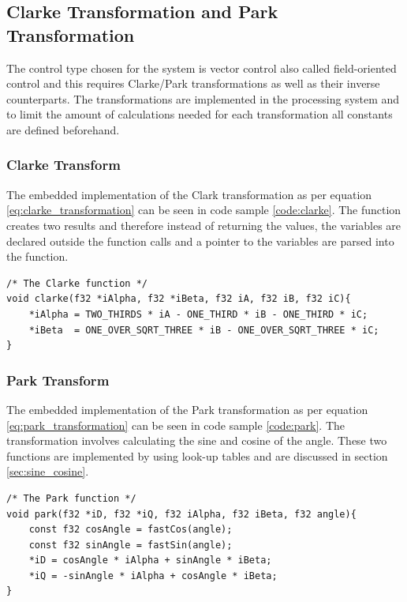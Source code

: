 \subsection{Clarke Transformation and Park Transformation}
The control type chosen for the system is vector control also called field-oriented control and this requires Clarke/Park transformations as well as their inverse counterparts.
The transformations are implemented in the processing system and to limit the amount of calculations needed for each transformation all constants are defined beforehand.

\subsubsection*{Clarke Transform}


The embedded implementation of the Clark transformation as per equation \ref{eq:clarke_transformation} can be seen in code sample \ref{code:clarke}. The function creates two results and therefore instead of returning the values, the variables are declared outside the function calls and a pointer to the variables are parsed into the function.

\begin{lstlisting}[style=c, caption=Embedded Clarke Transformation., label=code:clarke]
/* The Clarke function */
void clarke(f32 *iAlpha, f32 *iBeta, f32 iA, f32 iB, f32 iC){
	*iAlpha = TWO_THIRDS * iA - ONE_THIRD * iB - ONE_THIRD * iC;
	*iBeta  = ONE_OVER_SQRT_THREE * iB - ONE_OVER_SQRT_THREE * iC;
}
\end{lstlisting}

\subsubsection*{Park Transform}
The embedded implementation of the Park transformation as per equation \ref{eq:park_transformation} can be seen in code sample \ref{code:park}. The transformation involves calculating the sine and cosine of the angle. These two functions are implemented by using look-up tables and are discussed in section \ref{sec:sine_cosine}.

\begin{lstlisting}[style=c, caption=Embedded Park Transformation., label=code:park]
/* The Park function */
void park(f32 *iD, f32 *iQ, f32 iAlpha, f32 iBeta, f32 angle){
	const f32 cosAngle = fastCos(angle);
	const f32 sinAngle = fastSin(angle);
	*iD = cosAngle * iAlpha + sinAngle * iBeta;
	*iQ = -sinAngle * iAlpha + cosAngle * iBeta;
}
\end{lstlisting}

